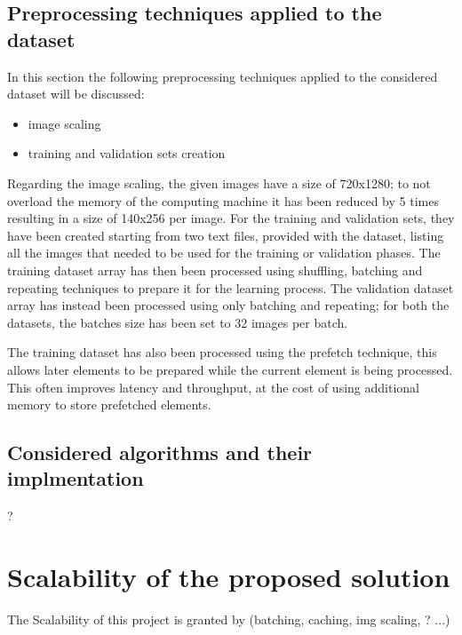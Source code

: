 \documentclass[a4paper,12pt]{article}
\begin{document}
\newpage
\subsection{Preprocessing techniques applied to the dataset}
In this section the following preprocessing techniques applied to the considered dataset will be discussed:
\begin{itemize}
	\item image scaling
	\item training and validation sets creation
\end{itemize}

Regarding the image scaling, the given images have a size of 720x1280; to not overload the memory of the computing machine it has been reduced by 5 times resulting in a size of 140x256 per image.
For the training and validation sets, they have been created starting from two text files, provided with the dataset, listing all the images that needed to be used for the training or validation phases.
The training dataset array has then been processed using shuffling, batching and repeating techniques to prepare it for the learning process.
The validation dataset array has instead been processed using only batching and repeating; for both the datasets, the batches size has been 
set to 32 images per batch.

The training dataset has also been processed using the prefetch technique, this
allows later elements to be prepared while the current element is being
processed. This often improves latency and throughput, at the cost of
using additional memory to store prefetched elements.



\newpage
\subsection{Considered algorithms and their implmentation}
?

\newpage
\section{Scalability of the proposed solution}
The Scalability of this project is granted by (batching, caching, img scaling, ? ...) 

\newpage
\end{document}
